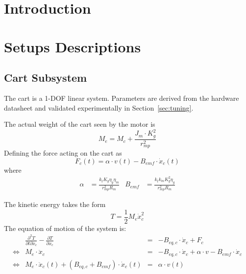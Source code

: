 \documentclass[11pt,a4paper]{article}
\begin{document}



\section{Introduction}

\section{Setups Descriptions}

\subsection{Cart Subsystem}
The cart is a 1-DOF linear system. Parameters are derived from the hardware datasheet and validated experimentally in Section~\ref{sec:tuning}.

The actual weight of the cart seen by the motor is
\begin{equation}
	M_e = M_c + \frac{J_m \cdot K_g^2}{r_{mp}^2}
\end{equation}
Defining the force acting on the cart as
\begin{equation}
	F_c(t) = \alpha \cdot v(t) - B_{emf} \cdot \dot{x}_c(t)
\end{equation}
where
\begin{align*}
	\alpha  & = \frac{k_tK_g\eta_g\eta_m}{r^2_{mp}R_m} &
	B_{emf} & = \frac{k_tk_mK^2_g\eta_g}{r^2_{mp}R_m}
\end{align*}

The kinetic energy takes the form
\begin{equation}
	T = \frac{1}{2}M_e\dot{x}_c^2
\end{equation}
The equation of motion of the system is:
\begin{equation}
	\label{eq:cart_eom}
	\begin{aligned}
		                & \frac{\partial^2T}{\partial t \partial \dot{x}_c} - \frac{\partial T}{\partial x_c} & = & -B_{eq,c} \cdot \dot{x}_c + F_c                                     \\
		\Leftrightarrow & M_e \cdot \ddot{x}_c                                                                & = & -B_{eq,c} \cdot \dot{x}_c + \alpha \cdot v - B_{emf}\cdot \dot{x}_c \\
		\Leftrightarrow & M_e \cdot \ddot{x}_c(t) + (B_{eq,c} + B_{emf}) \cdot \dot{x}_c (t)                  & = & \alpha \cdot v(t)
	\end{aligned}
\end{equation}
\end{document}
